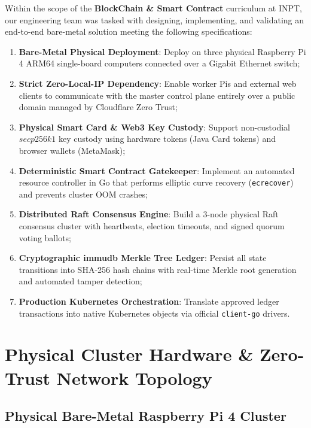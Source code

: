 \documentclass[a4paper,12pt]{article}
\begin{document}
Within the scope of the \textbf{BlockChain \& Smart Contract} curriculum at INPT, our engineering team was tasked with designing, implementing, and validating an end-to-end bare-metal solution meeting the following specifications:
\begin{enumerate}[leftmargin=1.2cm]
    \item \textbf{Bare-Metal Physical Deployment}: Deploy on three physical Raspberry Pi 4 ARM64 single-board computers connected over a Gigabit Ethernet switch;
    \item \textbf{Strict Zero-Local-IP Dependency}: Enable worker Pis and external web clients to communicate with the master control plane entirely over a public domain managed by Cloudflare Zero Trust;
    \item \textbf{Physical Smart Card \& Web3 Key Custody}: Support non-custodial $secp256k1$ key custody using hardware tokens (Java Card tokens) and browser wallets (MetaMask);
    \item \textbf{Deterministic Smart Contract Gatekeeper}: Implement an automated resource controller in Go that performs elliptic curve recovery (\texttt{ecrecover}) and prevents cluster OOM crashes;
    \item \textbf{Distributed Raft Consensus Engine}: Build a 3-node physical Raft consensus cluster with heartbeats, election timeouts, and signed quorum voting ballots;
    \item \textbf{Cryptographic immudb Merkle Tree Ledger}: Persist all state transitions into SHA-256 hash chains with real-time Merkle root generation and automated tamper detection;
    \item \textbf{Production Kubernetes Orchestration}: Translate approved ledger transactions into native Kubernetes objects via official \texttt{client-go} drivers.
\end{enumerate}

\newpage

\section{Physical Cluster Hardware \& Zero-Trust Network Topology}

\subsection{Physical Bare-Metal Raspberry Pi 4 Cluster}
\end{document}
